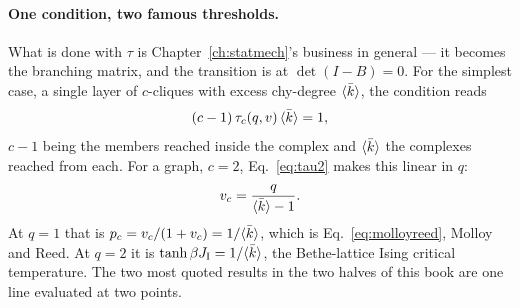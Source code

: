 \paragraph{One condition, two famous thresholds.} What is done with $\tau$ is
Chapter~\ref{ch:statmech}'s business in general --- it becomes the branching
matrix, and the transition is at $\det(I-B)=0$. For the simplest case, a single
layer of $c$-cliques with excess chy-degree $\langle \bar k \rangle$, the condition reads
\begin{equation}
  (c-1)\,\tau_{c}(q,v)\,\langle \bar k \rangle=1,
  \label{eq:branchcond}
\end{equation}
$c-1$ being the members reached inside the complex and $\langle \bar k \rangle$ the
complexes reached from each. For a graph, $c=2$, Eq.~\eqref{eq:tau2} makes this
linear in $q$:
\begin{equation}
  v_{c}=\frac{q}{\langle \bar k \rangle-1}.
\end{equation}
At $q=1$ that is $p_{c}=v_{c}/(1+v_{c})=1/\langle \bar k \rangle$, which is
Eq.~\eqref{eq:molloyreed}, Molloy and Reed. At $q=2$ it is
$\tanh\beta J_{\mathrm{I}}=1/\langle \bar k \rangle$, the Bethe-lattice Ising critical
temperature. The two most quoted results in the two halves of this book are one
line evaluated at two points.

